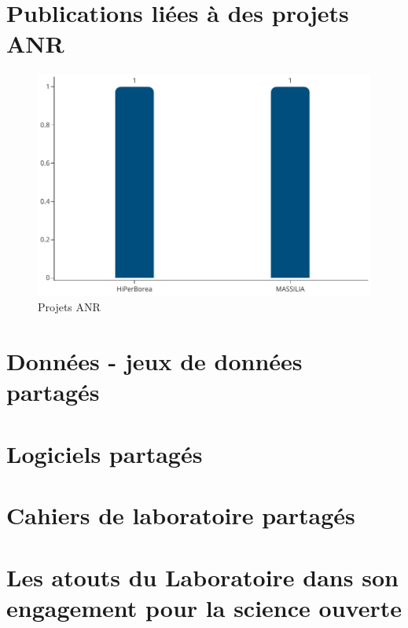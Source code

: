 \documentclass[french, 11pt]{../../dibiso/biso}
\begin{document}
\section{Publications liées à des projets ANR}

\begin{figure}[!h]
  \includegraphics[width=.8\textwidth]{figures/anr_projects.pdf}
  \centering
  \caption{Projets ANR}
  \label{fig_anr_projects}
\end{figure}


\pagebreak

\section{Données - jeux de données partagés}



\section{Logiciels partagés}



\section{Cahiers de laboratoire partagés}




\pagebreak

\section{Les atouts du Laboratoire dans son engagement pour la science ouverte}
\end{document}

